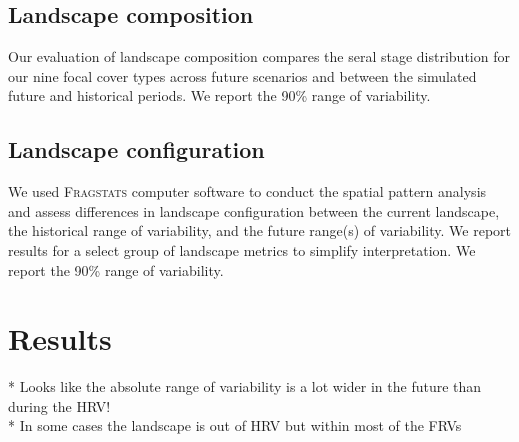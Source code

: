 \documentclass[12pt]{article}
\begin{document}
\begin{spacing}{1}
\subsection*{Landscape composition}
Our evaluation of landscape composition compares the seral stage distribution for our nine focal cover types across future scenarios and between the simulated future and historical periods. We report the 90\% range of variability.


\subsection*{Landscape configuration}
We used \textsc{Fragstats} computer software \citep{McGarigal2012} to conduct the spatial pattern analysis and assess differences in landscape configuration between the current landscape, the historical range of variability, and the future range(s) of variability. We report results for a select group of landscape metrics to simplify interpretation. We report the 90\% range of variability. %

\section*{Results}
* Looks like the absolute range of variability is a lot wider in the future than during the HRV!  \\
* In some cases the landscape is out of HRV but within most of the FRVs


\end{spacing}
\end{document}
